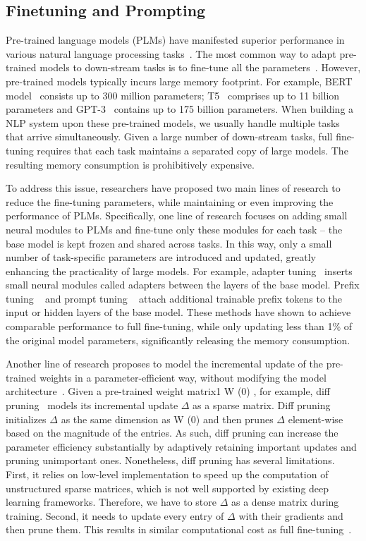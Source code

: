 \documentclass[withindex,glossary,firstyr]{cam-thesis}
\begin{document}
\subsection{Finetuning and Prompting}
Pre-trained language models (PLMs) have manifested superior performance in various natural language processing tasks~\cite{mBERT}. The most common way to adapt pre-trained models to down-stream tasks is to fine-tune all the parameters~\cite{lv2023parameter}. However, pre-trained models typically incurs large memory footprint. For example, BERT model~\cite{mBERT} consists up to 300 million parameters; T5~\cite{xue2020mt5} comprises up to 11 billion parameters and GPT-3~\cite{zhang2023gptfl} contains up to 175 billion parameters. When building a NLP system upon these pre-trained models, we usually handle multiple tasks that arrive simultaneously. Given a large number of down-stream tasks, full fine-tuning requires that each task maintains a separated copy of large models. The resulting memory consumption is prohibitively expensive.

To address this issue, researchers have proposed two main lines of research to reduce the fine-tuning parameters, while maintaining or even improving the performance of PLMs. Specifically, one line of research focuses on adding small neural modules to PLMs and fine-tune only these modules for each task – the base model is kept frozen and shared across tasks. In this way, only a small number of task-specific parameters are introduced and updated, greatly enhancing the practicality of large models. For example, adapter tuning~\cite{adapter} inserts small neural modules called adapters between the layers of the base model. Prefix tuning ~\cite{Prefix-Tuning} and prompt tuning ~\cite{prompt_tuning} attach additional trainable prefix tokens to the input or hidden layers of the base model. These methods have shown to achieve comparable performance to full fine-tuning, while only updating less than 1\% of the original model parameters, significantly releasing the memory consumption.

Another line of research proposes to model the incremental update of the pre-trained weights in a parameter-efficient way, without modifying the model architecture~\cite{bitfit}. Given a pre-trained weight matrix1 W (0) , for example, diff pruning~\cite{Prefix-Tuning} models its incremental update $\Delta$ as a sparse matrix. Diff pruning initializes $\Delta$ as the same dimension as W (0) and then prunes $\Delta$ element-wise based on the magnitude of the entries. As such, diff pruning can increase the parameter efficiency substantially by adaptively retaining important updates and pruning unimportant ones. Nonetheless, diff pruning has several limitations. First, it relies on low-level implementation to speed up the computation of unstructured sparse matrices, which is not well supported by existing deep learning frameworks. Therefore, we have to store $\Delta$ as a dense matrix during training. Second, it needs to update every entry of $\Delta$ with their gradients and then prune them. This results in similar computational cost as full fine-tuning~\cite{lora}.
\end{document}
